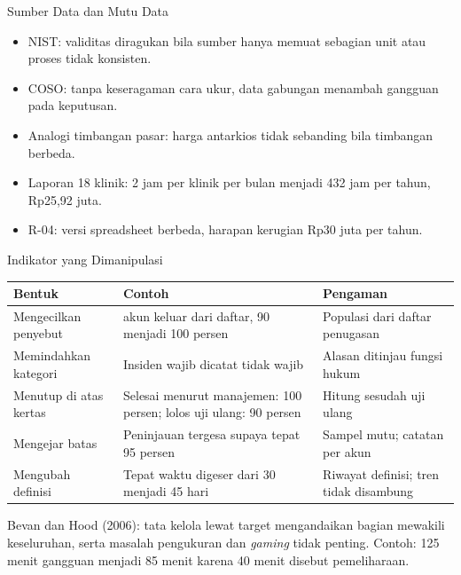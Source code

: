 \documentclass[aspectratio=169, table, 12pt]{beamer}
\begin{document}
\begin{frame}{{\Large Sumber Data dan Mutu Data}}
  \vspace{6pt}
  \small
  \begin{itemize}
    \item NIST: validitas diragukan bila sumber hanya memuat sebagian unit atau proses tidak
          konsisten.
    \item COSO: tanpa keseragaman cara ukur, data gabungan menambah gangguan pada keputusan.
    \item Analogi timbangan pasar: harga antarkios tidak sebanding bila timbangan berbeda.
    \item Laporan 18 klinik: 2 jam per klinik per bulan menjadi 432 jam per tahun, Rp25,92 juta.
    \item R-04: versi spreadsheet berbeda, harapan kerugian Rp30 juta per tahun.
  \end{itemize}
\end{frame}

\begin{frame}{{\Large Indikator yang Dimanipulasi}}
  \vspace{2pt}
  \scriptsize
  \begin{tabularx}{\textwidth}{|>{\raggedright\arraybackslash}p{}|>{\raggedright\arraybackslash}X|>{\raggedright\arraybackslash}X|}
    \hline
    \textbf{Bentuk} & \textbf{Contoh} & \textbf{Pengaman} \\ \hline
    Mengecilkan penyebut & 12 akun keluar dari daftar, 90 menjadi 100 persen & Populasi dari daftar
    penugasan \\ \hline
    Memindahkan kategori & Insiden wajib dicatat tidak wajib & Alasan ditinjau fungsi hukum \\
    \hline
    Menutup di atas kertas & Selesai menurut manajemen: 100 persen; lolos uji ulang: 90 persen &
    Hitung sesudah uji ulang \\ \hline
    Mengejar batas & Peninjauan tergesa supaya tepat 95 persen & Sampel mutu; catatan per akun \\
    \hline
    Mengubah definisi & Tepat waktu digeser dari 30 menjadi 45 hari & Riwayat definisi; tren tidak
    disambung \\ \hline
  \end{tabularx}

  \vspace{6pt}
  \small Bevan dan Hood (2006): tata kelola lewat target mengandaikan bagian mewakili keseluruhan,
  serta masalah pengukuran dan \textit{gaming} tidak penting. Contoh: 125 menit gangguan menjadi 85
  menit karena 40 menit disebut pemeliharaan.
\end{frame}
\end{document}
